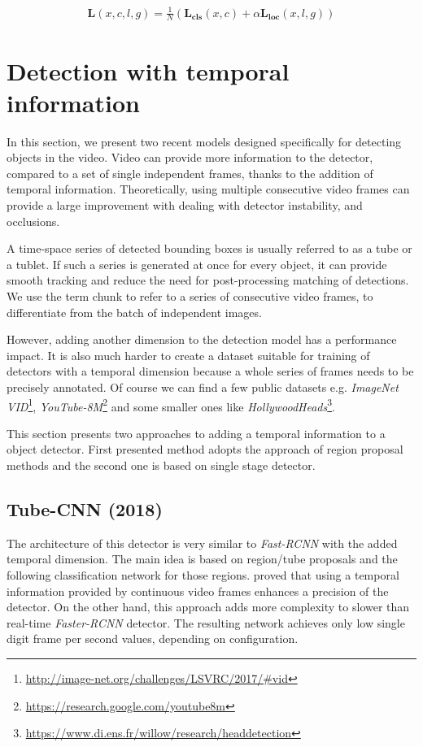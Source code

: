 \begin{align*}
\mathbf{L}(x,c,l,g) = \frac{1}{N}(\mathbf{L_{\text{cls}}}(x,c) + \alpha\mathbf{L_{\text{loc}}}(x,l,g))
\end{align*}

\section{Detection with temporal information}
In this section, we present two recent models designed specifically for detecting objects in the video. Video can provide more information to the detector, compared to a set of single independent frames, thanks to the addition of temporal information. Theoretically, using multiple consecutive video frames can provide a large improvement with dealing with detector instability, and occlusions. 

A time-space series of detected bounding boxes is usually referred to as a tube or a tublet. If such a series is generated at once for every object, it can provide smooth tracking and reduce the need for post-processing matching of detections. We use the term chunk to refer to a series of consecutive video frames, to differentiate from the batch of independent images.

However, adding another dimension to the detection model has a performance impact. It is also much harder to create a dataset suitable for training of detectors with a temporal dimension because a whole series of frames needs to be precisely annotated. Of course we can find a few public datasets e.g. \textit{ImageNet VID}\footnote{\url{http://image-net.org/challenges/LSVRC/2017/\#vid}}, \textit{YouTube-8M}\footnote{\url{https://research.google.com/youtube8m}} and some smaller ones like \textit{HollywoodHeads}\footnote{\url{https://www.di.ens.fr/willow/research/headdetection}}.

This section presents two approaches to adding a temporal information to a object detector. First presented method adopts the approach of region proposal methods and the second one is based on single stage detector.


\subsection{Tube-CNN (2018)}
\label{sed:tubecnn}
The architecture of this detector is very similar to \textit{Fast-RCNN} with the added temporal dimension. The main idea is based on region/tube proposals and the following classification network for those regions. \citeauthor{bib:tubeCNN} \cite{bib:tubeCNN} proved that using a temporal information provided by continuous video frames enhances a precision of the detector. On the other hand, this approach adds more complexity to slower than real-time \textit{Faster-RCNN} detector. The resulting network achieves only low single digit frame per second values, depending on configuration. 

